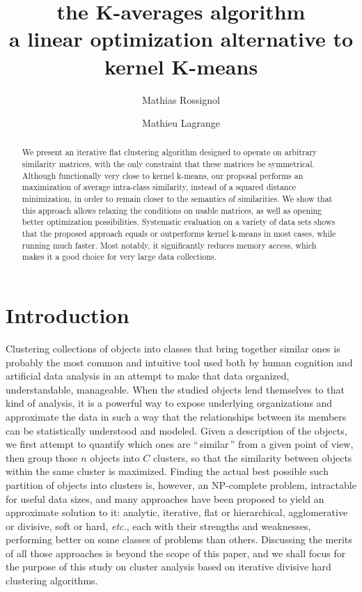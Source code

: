 \documentclass[a4paper,twoside]{article}
\begin{document}
\title{the K-averages algorithm \\ a linear optimization alternative to kernel K-means}

\author{Mathias Rossignol \and Mathieu Lagrange}

\editor{}

\maketitle


\begin{abstract}

We present an iterative flat clustering algorithm designed to operate on arbitrary similarity matrices, with the only constraint that these matrices be symmetrical. Although functionally very close to kernel k-means, our proposal performs an maximization of average intra-class similarity, instead of a squared distance minimization, in order to remain closer to the semantics of similarities. We show that this approach allows relaxing the conditions on usable matrices, as well as opening better optimization possibilities. Systematic evaluation on a variety of data sets shows that the proposed approach equals or outperforms kernel k-means in most cases, while running much faster. Most notably, it significantly reduces memory access, which makes it a good choice for very large data collections.

\end{abstract}


\section{Introduction}

Clustering collections of objects into classes that bring together similar ones is probably the most common and intuitive tool used both by human cognition and artificial data analysis in an attempt to make that data organized, understandable, manageable. When the studied objects lend themselves to that kind of analysis, it is a powerful way to expose underlying organizations and approximate the data in such a way that the relationships between its members can be statistically understood and modeled. Given a description of the objects, we first attempt to quantify which ones are ``\,similar\,'' from a given point of view, then group those $n$ objects into $C$ clusters, so that the similarity between objects within the same cluster is maximized. Finding the actual best possible such partition of objects into clusters is, however, an NP-complete problem, intractable for useful data sizes, and many approaches have been proposed to yield an approximate solution to it: analytic, iterative, flat or hierarchical, agglomerative or divisive, soft or hard, \textit{etc.}, each with their strengths and weaknesses, performing better on some classes of problems than others. Discussing the merits of all those approaches is beyond the scope of this paper, and we shall focus for the purpose of this study on cluster analysis based on iterative divisive hard clustering algorithms.
\end{document}
